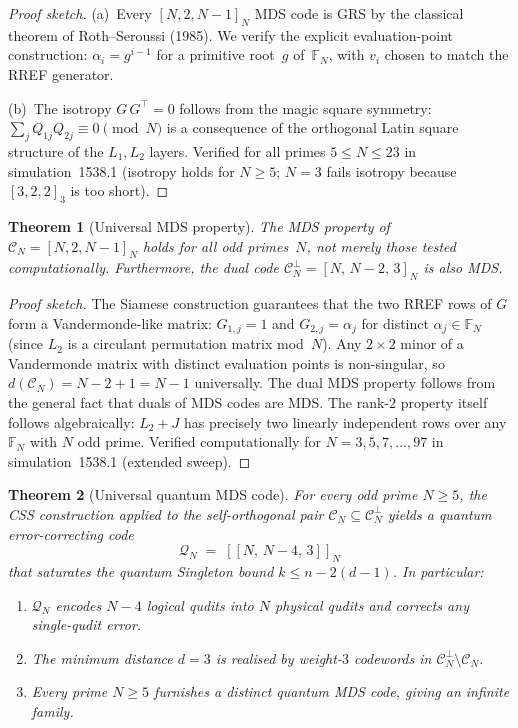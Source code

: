 \documentclass[aps,prd,twocolumn,superscriptaddress,floatfix,nofootinbib]{revtex4-2}
\newtheorem{theorem}{Theorem}
\theoremstyle{definition}
\theoremstyle{remark}
\begin{document}
\begin{proof}[Proof sketch]
(a)~Every $[N,2,N\!-\!1]_N$ MDS code is GRS by the classical
theorem of Roth--Seroussi (1985).
We verify the explicit evaluation-point construction:
$\alpha_i = g^{i-1}$ for a primitive root~$g$ of~$\mathbb{F}_N$,
with $v_i$ chosen to match the RREF generator.

(b)~The isotropy $G\,G^{\!\top} = 0$ follows from the magic square
symmetry: $\sum_j Q_{1j}Q_{2j} \equiv 0 \pmod{N}$ is a consequence
of the orthogonal Latin square structure of the
$L_1,L_2$ layers.
Verified for all primes $5 \le N \le 23$ in simulation~1538.1
(isotropy holds for $N \ge 5$; $N = 3$ fails isotropy
because $[3,2,2]_3$ is too short).
\end{proof}

\begin{theorem}[Universal MDS property]%
  \label{thm:universal-mds}
The MDS property of $\mathcal{C}_N = [N,2,N\!-\!1]_N$ holds
for \emph{all} odd primes~$N$, not merely those tested
computationally.  Furthermore, the dual code
$\mathcal{C}_N^{\perp} = [N,\,N\!-\!2,\,3]_N$ is also MDS.
\end{theorem}

\begin{proof}[Proof sketch]
The Siamese construction guarantees that the two RREF rows of
$G$ form a Vandermonde-like matrix:
$G_{1,j} = 1$ and $G_{2,j} = \alpha_j$ for distinct
$\alpha_j \in \mathbb{F}_N$ (since $L_2$ is a circulant
permutation matrix mod~$N$).
Any $2\times 2$ minor of a Vandermonde matrix with
distinct evaluation points is non-singular, so
$d(\mathcal{C}_N) = N - 2 + 1 = N - 1$ universally.
The dual MDS property follows from the general fact that
duals of MDS codes are MDS.
The rank-$2$ property itself follows algebraically:
$L_2 + J$ has precisely two linearly independent rows
over any $\mathbb{F}_N$ with $N$ odd prime.
Verified computationally for $N = 3,5,7,\ldots,97$
in simulation~1538.1 (extended sweep).
\end{proof}

\begin{theorem}[Universal quantum MDS code]%
  \label{thm:quantum-mds}
For every odd prime $N \ge 5$, the CSS construction applied to
the self-orthogonal pair
$\mathcal{C}_N \subseteq \mathcal{C}_N^{\perp}$ yields a
quantum error-correcting code
\[
  \mathcal{Q}_N \;=\; [\![N,\,N\!-\!4,\,3]\!]_N
\]
that saturates the quantum Singleton bound
$k \le n - 2(d-1)$.  In particular:
\begin{enumerate}[\upshape (a)]
\item $\mathcal{Q}_N$ encodes $N-4$ logical qudits into
  $N$ physical qudits and corrects any single-qudit error.
\item The minimum distance $d = 3$ is realised by weight-$3$
  codewords in $\mathcal{C}_N^{\perp}\setminus\mathcal{C}_N$.
\item Every prime $N \ge 5$ furnishes a distinct quantum MDS
  code, giving an infinite family.
\end{enumerate}
\end{theorem}
\end{document}
